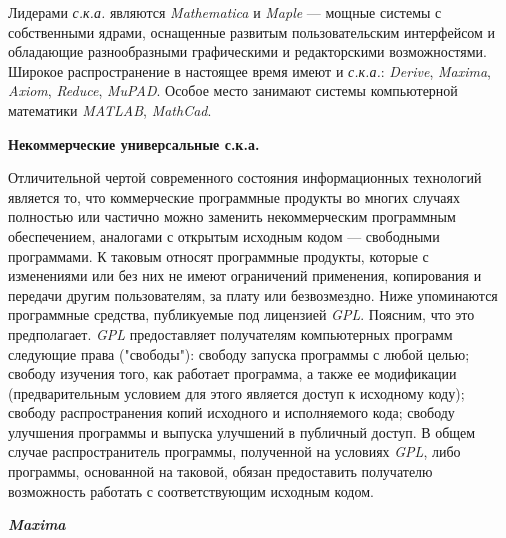 Лидерами \textit{с.к.а.} являются \textit{Mathematica} и \textit{Maple} --- мощные системы с собственными ядрами, оснащенные развитым пользовательским интерфейсом и обладающие разнообразными графическими и редакторскими возможностями. Широкое распространение в настоящее время имеют и \textit{с.к.а.}: \textit{Derive}, \textit{Maxima}, \textit{Axiom}, \textit{Reduce}, \textit{MuPAD}. Особое место занимают системы компьютерной математики \textit{MATLAB}, \textit{MathCad}.

\textbf{Некоммерческие универсальные с.к.а.}

Отличительной чертой современного состояния информационных технологий является то, что коммерческие программные продукты во многих случаях полностью или частично можно заменить некоммерческим программным обеспечением, аналогами с открытым исходным кодом --- свободными программами. К таковым относят программные продукты, которые с изменениями или без них не имеют ограничений применения, копирования и передачи другим пользователям, за плату или безвозмездно. Ниже упоминаются программные средства, публикуемые под лицензией \textit{GPL}. Поясним, что это предполагает. \textit{GPL} предоставляет получателям компьютерных программ следующие права ("свободы"{}): свободу запуска программы с любой целью; свободу изучения того, как работает программа, а также ее модификации (предварительным условием для этого является доступ к исходному коду); свободу распространения копий исходного и исполняемого кода; свободу улучшения программы и выпуска улучшений в публичный доступ. В общем случае распространитель программы, полученной на условиях \textit{GPL}, либо программы, основанной на таковой, обязан предоставить получателю возможность работать с соответствующим исходным кодом.

\textbf{\textit{Maxima}}

